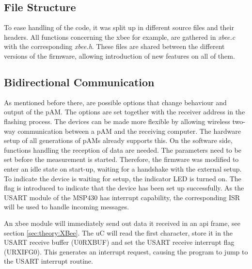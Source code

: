 
\subsection{File Structure}
To ease handling of the code, it was split up in different source files and their headers. All functions concerning the \acs{xbee} for example, are gathered in \textit{xbee.c} with the corresponding \textit{xbee.h}. These files are shared between the different versions of the firmware, allowing introduction of new features on all of them.

\subsection{Bidirectional Communication}\label{sec:2waycom}
As mentioned before there, are possible options that change behaviour and output of the \ac{pAM}. The options are set together with the receiver address in the flashing process. The devices can be made more flexible by allowing wireless two-way communication between a \ac{pAM} and the receiving computer. The hardware setup of all generations of \acp{pAM} already supports this. On the software side, functions handling the reception of data are needed. 
The parameters need to be set before the measurement is started. Therefore, the firmware was modified to enter an idle state on start-up, waiting for a handshake with the external setup. To indicate the device is waiting for setup, the indicator LED is turned on. The  flag is introduced to indicate that the device has been set up successfully. 
As the USART module of the MSP430 has interrupt capability, the corresponding \ac{ISR} will be used to handle incoming messages. 

An \acs{xbee} module will immediately send out data it received in an \ac{api} frame, see section \ref{sec:theory:XBee}. The \ac{uC} will read the first character, store it in the \ac{USART} receive buffer (U0RXBUF) and set the \ac{USART} receive interrupt flag (URXIFG0). This generates an interrupt request, causing the program to jump to the \ac{USART} interrupt routine. 

